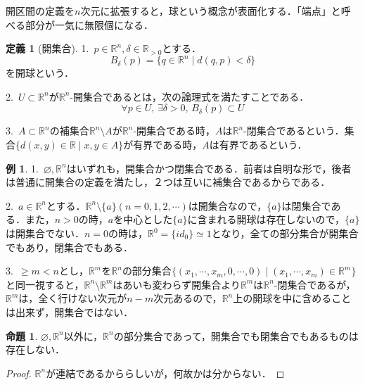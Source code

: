 \documentclass[uplatex, 12pt, dvipdfmx]{jsreport}
\theoremstyle{definition}
\newtheorem{proposition}[theorem]{命題}
\newtheorem{definition}[theorem]{定義}
\newtheorem{example}[theorem]{例}
\theoremstyle{StatementsWithStar}
\theoremstyle{StatementsWithStar2}
\theoremstyle{StatementsWithStar3}
\theoremstyle{StatementsWithCCirc}
\theoremstyle{definition}
\begin{document}
開区間の定義を$n$次元に拡張すると，球という概念が表面化する．「端点」と呼べる部分が一気に無限個になる．
\begin{definition}[開集合]\rm{}

    1.\, $p\in\mathbb{R}^n, \delta\in\mathbb{R}_{>0}$とする．
    $$B_\delta (p)=\{ q\in\mathbb{R}^n \mid d(q,p)<\delta \} $$
    を開球という．
    
    2.\, $U\subset\mathbb{R}^n$が$\mathbb{R}^n$-開集合であるとは，次の論理式を満たすことである．
    $$\forall p\in U,\, \exists\delta >0,\, B_\delta (p)\subset U$$

    3.\, $A\subset\mathbb{R}^n$の補集合$\mathbb{R}^n\setminus A$が$\mathbb{R}^n$-開集合である時，$A$は$\mathbb{R}^n$-閉集合であるという．集合$\{d(x,y)\in\mathbb{R}\mid x,y\in A\}$が有界である時，$A$は有界であるという．
\end{definition}

\begin{example}\rm{}

    1.\, $\varnothing,\mathbb{R}^n$はいずれも，開集合かつ閉集合である．前者は自明な形で，後者は普通に開集合の定義を満たし，２つは互いに補集合であるからである．

    2.\, $a\in\mathbb{R}^n$とする．$\mathbb{R}^n\setminus \{a\}(n=0,1,2,\cdots)$は開集合なので，$\{a\}$は閉集合である．また，$n>0$の時，$a$を中心とした$\{a\}$に含まれる開球は存在しないので，$\{a\}$は開集合でない．$n=0$の時は，$\mathbb{R}^0=\{id_0\}\simeq 1$となり，全ての部分集合が開集合でもあり，閉集合でもある．

    3.\, $\ge m<n$とし，$\mathbb{R}^m$を$\mathbb{R}^n$の部分集合$\{(x_1,\cdots,x_m,0,\cdots,0)\mid (x_1,\cdots,x_m)\in\mathbb{R}^m\}$と同一視すると，$\mathbb{R}^n\setminus\mathbb{R}^m$はあいも変わらず開集合より$\mathbb{R}^m$は$\mathbb{R}^n$-閉集合であるが，$\mathbb{R}^m$は，全く行けない次元が$n-m$次元あるので，$\mathbb{R}^n$上の開球を中に含めることは出来ず，開集合ではない．
\end{example}

\begin{proposition}
    $\varnothing,\mathbb{R}^n$以外に，$\mathbb{R}^n$の部分集合であって，開集合でも閉集合でもあるものは存在しない．
\end{proposition}
\begin{proof}
    $\mathbb{R}^n$が連結であるかららしいが，何故かは分からない．
\end{proof}
\end{document}
